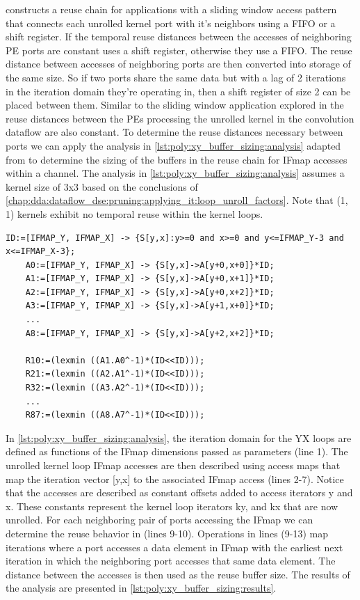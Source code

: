 \cite{meeus} constructs a reuse chain for applications with a sliding window
access pattern that connects each unrolled kernel port with it's neighbors using
a FIFO or a shift register. If the temporal reuse distances between the accesses
of neighboring PE ports are constant \cite{meeus} uses a shift register,
otherwise they use a FIFO. The reuse distance between accesses of neighboring
ports are then converted into storage of the same size. So if two ports share
the same data but with a lag of 2 iterations in the iteration domain they're
operating in, then a shift register of size 2 can be placed between them.
Similar to the sliding window application explored in \cite{meeus} the reuse
distances between the PEs processing the unrolled kernel in the convolution
dataflow are also constant. To determine the reuse distances necessary between
ports we can apply the analysis in \autoref{lst:poly:xy_buffer_sizing:analysis}
adapted from \cite{meeus} to determine the sizing of the buffers in the reuse
chain for IFmap accesses within a channel. The analysis in
\autoref{lst:poly:xy_buffer_sizing:analysis} assumes a kernel size of 3x3 based
on the conclusions of
\autoref{chap:dda:dataflow_dse:pruning:applying_it:loop_unroll_factors}. Note
that (1, 1) kernels exhibit no temporal reuse within the kernel loops.  

\begin{lstlisting}[caption=Determining buffer sizes in 3x3 convolutions, label={lst:poly:xy_buffer_sizing:analysis}]
    ID:=[IFMAP_Y, IFMAP_X] -> {S[y,x]:y>=0 and x>=0 and y<=IFMAP_Y-3 and x<=IFMAP_X-3};
    A0:=[IFMAP_Y, IFMAP_X] -> {S[y,x]->A[y+0,x+0]}*ID;
    A1:=[IFMAP_Y, IFMAP_X] -> {S[y,x]->A[y+0,x+1]}*ID;
    A2:=[IFMAP_Y, IFMAP_X] -> {S[y,x]->A[y+0,x+2]}*ID;
    A3:=[IFMAP_Y, IFMAP_X] -> {S[y,x]->A[y+1,x+0]}*ID;
    ...
    A8:=[IFMAP_Y, IFMAP_X] -> {S[y,x]->A[y+2,x+2]}*ID;

    R10:=(lexmin ((A1.A0^-1)*(ID<<ID)));
    R21:=(lexmin ((A2.A1^-1)*(ID<<ID)));
    R32:=(lexmin ((A3.A2^-1)*(ID<<ID)));
    ...
    R87:=(lexmin ((A8.A7^-1)*(ID<<ID)));
\end{lstlisting}

In \autoref{lst:poly:xy_buffer_sizing:analysis}, the iteration domain for the YX
loops are defined as functions of the IFmap dimensions passed as parameters (line 1).
The unrolled kernel loop IFmap accesses are then described using access maps
that map the iteration vector [y,x] to the associated IFmap access (lines 2-7).
Notice that the accesses are described as constant offsets added to access iterators y
and x. These constants represent the kernel loop iterators ky, and kx that are now
unrolled. For each neighboring pair of ports accessing the IFmap we can
determine the reuse behavior in (lines 9-10). Operations in lines (9-13) map
iterations where a port accesses a data element in IFmap with the earliest next
iteration in which the neighboring port accesses that same data element. The
distance between the accesses is then used as the reuse buffer size. The results
of the analysis are presented in \autoref{lst:poly:xy_buffer_sizing:results}.

